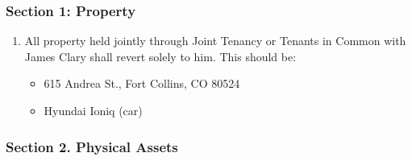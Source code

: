 \subsubsection*{Section 1: Property}\label{section-1-property}

\begin{enumerate}
\def\labelenumi{\arabic{enumi}.}
\tightlist
\item
  All property held jointly through Joint Tenancy or Tenants in Common with James Clary shall revert solely to him. This should be:

  \begin{itemize}
  \tightlist
  \item
    615 Andrea St., Fort Collins, CO 80524
  \item
    Hyundai Ioniq (car)
  \end{itemize}
\end{enumerate}

\subsubsection*{Section 2. Physical Assets}\label{section-2.-physical-assets}


